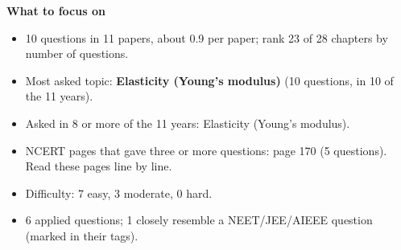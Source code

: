 \begin{minipage}[t]{0.63\linewidth}{\small\textbf{\color{crimson}What to focus on}\par\smallskip
\begin{itemize}[leftmargin=1.1em,itemsep=1pt,topsep=0pt]
\item 10 questions in 11 papers, about 0.9 per paper; rank 23 of 28 chapters by number of questions.
\item Most asked topic: \textbf{Elasticity (Young's modulus)} (10 questions, in 10 of the 11 years).
\item Asked in 8 or more of the 11 years: Elasticity (Young's modulus).
\item NCERT pages that gave three or more questions: page 170 (5 questions). Read these pages line by line.
\item Difficulty: 7 easy, 3 moderate, 0 hard.
\item 6 applied questions; 1 closely resemble a NEET/JEE/AIEEE question (marked in their tags).
\end{itemize}}\end{minipage}\par
{}
